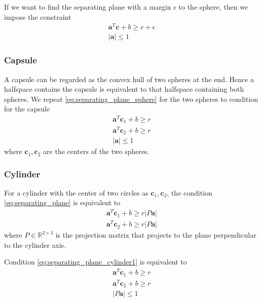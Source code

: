 \documentclass{article}
\renewcommand{\vec}[1]{\mathbf{#1}}
\begin{document}
If we want to find the separating plane with a margin $\epsilon$ to the sphere, then we impose the constraint
\begin{subequations}
\begin{align}
	\vec{a}^T\vec{c} + b \ge r+\epsilon\\
	|\vec{a}|\le 1
\end{align}
\label{eq:separating_plane_sphere_w_margin}
\end{subequations}
\subsubsection{Capsule}
A capsule can be regarded as the convex hull of two spheres at the end. Hence a halfspace contains the capsule is equivalent to that halfspace containing both spheres. We repeat \eqref{eq:separating_plane_sphere} for the two spheres to condition for the capsule
\begin{subequations}
\begin{align}
	\vec{a}^T\vec{c}_1 + b \ge r\\
	\vec{a}^T\vec{c}_2 + b \ge r\\
	|\vec{a}|\le 1
\end{align}
\label{eq:separating_plane_capsule}
\end{subequations}
where $\vec{c}_1, \vec{c}_2$ are the centers of the two spheres.

\subsubsection{Cylinder}
For a cylinder with the center of two circles as $\vec{c}_1, \vec{c}_2$, the condition \eqref{eq:separating_plane} is equivalent to
\begin{subequations}
\begin{align}
	\vec{a}^T\vec{c}_1 + b \ge r|P\vec{a}|\\
	\vec{a}^T\vec{c}_2 + b \ge r|P\vec{a}|
\end{align}
\label{eq:separating_plane_cylinder1}
\end{subequations}
where $P\in\mathbb{R}^{2\times 3}$ is the projection matrix that projects to the plane perpendicular to the cylinder axis.

Condition \eqref{eq:separating_plane_cylinder1} is equivalent to
\begin{subequations}
\begin{align}
	\vec{a}^T\vec{c}_1 + b \ge r\\
	\vec{a}^T\vec{c}_2 + b \ge r\\
	|P\vec{a}|\le 1
\end{align}
\label{eq:separating_plane_cylinder2}
\end{subequations}
\end{document}
